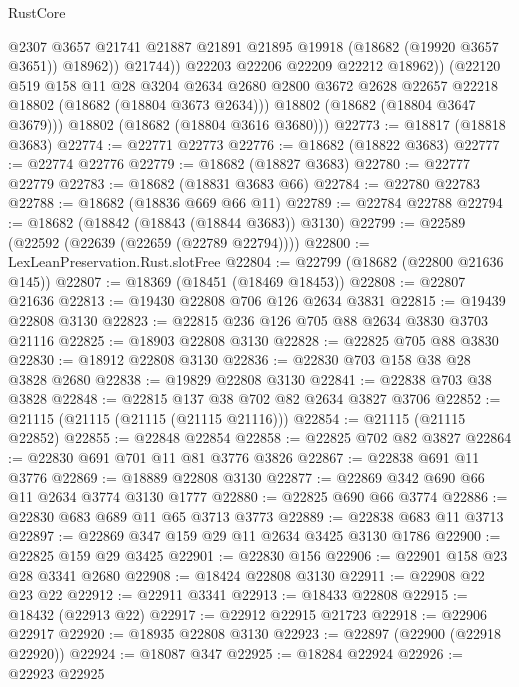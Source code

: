 \begin{lexlean}{RustCore}
\begin{coremodule}
                    @2307
                    @3657
                    @21741
                    @21887
                    @21891
                    @21895
                    @19918
                    (@18682 (@19920 @3657 @3651))
                    @18962))
                @21744))
            @22203
            @22206
            @22209
            @22212
            @18962))
        (@22120
          @519
          @158
          @11
          @28
          @3204
          @2634
          @2680
          @2800
          @3672
          @2628
          @22657
          @22218
          @18802
          (@18682 (@18804 @3673 @2634)))
        @18802
        (@18682 (@18804 @3647 @3679)))
      @18802
      (@18682 (@18804 @3616 @3680)))
@22773 := @18817 (@18818 @3683)
@22774 := @22771 @22773
@22776 := @18682 (@18822 @3683)
@22777 := @22774 @22776
@22779 := @18682 (@18827 @3683)
@22780 := @22777 @22779
@22783 := @18682 (@18831 @3683 @66)
@22784 := @22780 @22783
@22788 := @18682 (@18836 @669 @66 @11)
@22789 := @22784 @22788
@22794 := @18682 (@18842 (@18843 (@18844 @3683)) @3130)
@22799 := @22589 (@22592 (@22639 (@22659 (@22789 @22794))))
@22800 := LexLeanPreservation.Rust.slotFree
@22804 := @22799 (@18682 (@22800 @21636 @145))
@22807 := @18369 (@18451 (@18469 @18453))
@22808 := @22807 @21636
@22813 := @19430 @22808 @706 @126 @2634 @3831
@22815 := @19439 @22808 @3130
@22823 := @22815 @236 @126 @705 @88 @2634 @3830 @3703 @21116
@22825 := @18903 @22808 @3130
@22828 := @22825 @705 @88 @3830
@22830 := @18912 @22808 @3130
@22836 := @22830 @703 @158 @38 @28 @3828 @2680
@22838 := @19829 @22808 @3130
@22841 := @22838 @703 @38 @3828
@22848 := @22815 @137 @38 @702 @82 @2634 @3827 @3706
@22852 := @21115 (@21115 (@21115 (@21115 @21116)))
@22854 := @21115 (@21115 @22852)
@22855 := @22848 @22854
@22858 := @22825 @702 @82 @3827
@22864 := @22830 @691 @701 @11 @81 @3776 @3826
@22867 := @22838 @691 @11 @3776
@22869 := @18889 @22808 @3130
@22877 := @22869 @342 @690 @66 @11 @2634 @3774 @3130 @1777
@22880 := @22825 @690 @66 @3774
@22886 := @22830 @683 @689 @11 @65 @3713 @3773
@22889 := @22838 @683 @11 @3713
@22897 := @22869 @347 @159 @29 @11 @2634 @3425 @3130 @1786
@22900 := @22825 @159 @29 @3425
@22901 := @22830 @156
@22906 := @22901 @158 @23 @28 @3341 @2680
@22908 := @18424 @22808 @3130
@22911 := @22908 @22 @23 @22
@22912 := @22911 @3341
@22913 := @18433 @22808
@22915 := @18432 (@22913 @22)
@22917 := @22912 @22915 @21723
@22918 := @22906 @22917
@22920 := @18935 @22808 @3130
@22923 := @22897 (@22900 (@22918 @22920))
@22924 := @18087 @347
@22925 := @18284 @22924
@22926 := @22923 @22925

\end{coremodule}
\end{lexlean}
